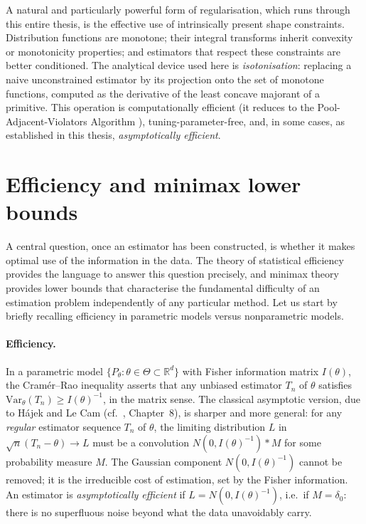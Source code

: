 A natural and particularly powerful form of regularisation, which runs through this entire thesis, is the effective use of intrinsically present shape constraints. Distribution functions are monotone; their integral transforms inherit convexity or monotonicity properties; and estimators that respect these constraints are better conditioned. The analytical device used here is \textit{isotonisation}: replacing a naive unconstrained estimator by its projection onto the set of monotone functions, computed as the derivative of the least concave majorant of a primitive. This operation is computationally efficient (it reduces to the Pool-Adjacent-Violators Algorithm \cite{61}), tuning-parameter-free, and, in some cases, as established in this thesis, \textit{asymptotically efficient}.

\section{Efficiency and minimax lower bounds}\label{sec: efficiency intro}

A central question, once an estimator has been constructed, is whether it makes optimal use of the information in the data. The theory of statistical efficiency provides the language to answer this question precisely, and minimax theory provides lower bounds that characterise the fundamental difficulty of an estimation problem independently of any particular method. Let us start by briefly recalling efficiency in parametric models versus nonparametric models.

\paragraph{Efficiency.}
In a parametric model $\{P_\theta : \theta \in \Theta \subset \mathbb{R}^d\}$ with Fisher information matrix $I(\theta)$, the Cram\'{e}r--Rao inequality asserts that any unbiased estimator $T_n$ of $\theta$ satisfies $\mathrm{Var}_\theta(T_n) \geq I(\theta)^{-1}$, in the matrix sense. The classical asymptotic version, due to H\'{a}jek and Le Cam (cf.\ \cite{6}, Chapter~8), is sharper and more general: for any \textit{regular} estimator sequence $T_n$ of $\theta$, the limiting distribution $L$ in $\sqrt{n}(T_n - \theta) \to L$ must be a convolution $N(0, I(\theta)^{-1}) * M$ for some probability measure $M$. The Gaussian component $N(0, I(\theta)^{-1})$ cannot be removed; it is the irreducible cost of estimation, set by the Fisher information. An estimator is \textit{asymptotically efficient} if $L = N(0, I(\theta)^{-1})$, i.e.\ if $M = \delta_0$: there is no superfluous noise beyond what the data unavoidably carry. 

